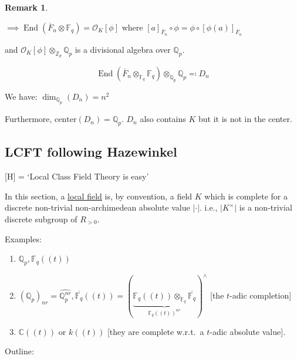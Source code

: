 \documentclass{article}
\theoremstyle{definition}
\numberwithin{theorem}{subsection}
\newtheorem*{remark}{Remark}
\begin{document}
\begin{remark}
\begin{enumerate}[label=\arabic*)]
            \(\implies \operatorname{End}(\overline{F}_n \otimes \mathbb{F}_q) = \mathcal{O}_K[\phi]\) where \([a]_{\overline{F}_n} \circ \phi = \phi \circ [\phi(a)]_{\overline{F}_n}\)
            
            and \(\mathcal{O}_K[\phi]\otimes_{\mathbb{Z}_p} \mathbb{Q}_p\) is a divisional algebra over \(\mathbb{Q}_p\).

            \[
                \operatorname{End}(\overline{F}_n \otimes_{\mathbb{F}_q}\mathbb{F}_q) \otimes_{\mathbb{Q}_p} \mathbb{Q}_p \eqqcolon D_n  
            \]

            We have: \(\dim_{\mathbb{Q}_p}(D_n) = n^2\) 
            
            Furthermore, \(\text{center}(D_n) = \mathbb{Q}_p\). \(D_n\) also contains \(K\) but it is not in the center.  
        \end{enumerate} 
    \end{remark}

    \subsection{LCFT following Hazewinkel}

    [H] = `Local Class Field Theory is easy'

    In this section, a \underline{local field} is, by convention, a field \(K\) which is complete for a discrete non-trivial non-archimedean absolute value \(\vert \cdot \vert\). i.e., \(\vert K^\times \vert\) is a non-trivial discrete subgroup of \(R_{> 0}\).

    Examples:

    \begin{enumerate}[label=\arabic*)]
        \item \(\mathbb{Q}_p, \mathbb{F}_{q}((t))\)
        \item \((\mathbb{Q}_p)_{nr} = \widehat{\mathbb{Q}_p^{nr}}, \overline{\mathbb{F}_q}((t)) = (\underbrace{\mathbb{F}_q((t)) \otimes_{\mathbb{F}_q} \overline{\mathbb{F}_q}}_{\mathbb{F}_q((t))^{nr}})^\wedge\) [the \(t\)-adic completion]
        \item \(\mathbb{C}((t))\) or \(k((t))\) [they are complete w.r.t.\ a \(t\)-adic absolute value].
    \end{enumerate} 

    Outline:
\end{document}
